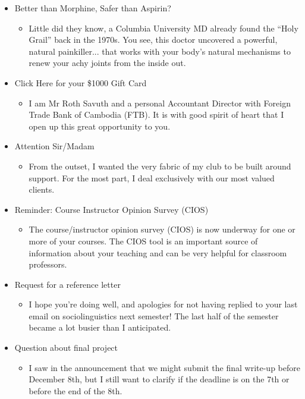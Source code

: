 \begin{itemize}
    \item  Better than Morphine, Safer than Aspirin?
        \begin{itemize}
                  \item  Little did they know, a Columbia University MD already found the ``Holy Grail'' back in the 1970s. You see, this doctor uncovered a powerful, natural painkiller... that works with your body's natural mechanisms to renew your achy joints from the inside out.
        \end{itemize}
    \item  Click Here for your \$1000 Gift Card
        \begin{itemize}
                \item  I am Mr Roth Savuth and a personal Accountant Director with Foreign Trade Bank of Cambodia (FTB). It is with good spirit of heart that I open up this great opportunity to you.
        \end{itemize}
    \item  Attention Sir/Madam
        \begin{itemize}
                \item  From the outset, I wanted the very fabric of my club to be built around support. For the most part, I deal exclusively with our most valued clients.
        \end{itemize}
    \item  Reminder: Course Instructor Opinion Survey (CIOS)
        \begin{itemize}
                \item  The course/instructor opinion survey (CIOS) is now underway for one or more of your courses. The CIOS tool is an important source of information about your teaching and can be very helpful for classroom professors.
        \end{itemize}
    \item Request for a reference letter
        \begin{itemize}
                \item  I hope you're doing well, and apologies for not having replied to your last email on sociolinguistics next semester! The last half of the semester became a lot busier than I anticipated. 
        \end{itemize}
    \item  Question about final project
        \begin{itemize}
                \item  I saw in the announcement that we might submit the final write-up before December 8th, but I still want to clarify if the deadline is on the 7th or before the end of the 8th.
        \end{itemize}
    
\end{itemize}




